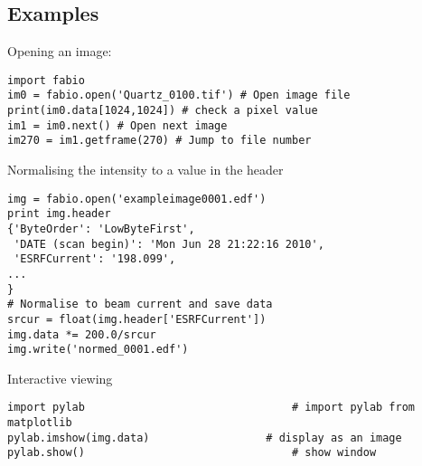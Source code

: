 \documentclass{iucr}
\begin{document}
\subsection{Examples}

Opening an image:

\begin{verbatim}
import fabio     
im0 = fabio.open('Quartz_0100.tif') # Open image file
print(im0.data[1024,1024]) # check a pixel value
im1 = im0.next() # Open next image
im270 = im1.getframe(270) # Jump to file number
\end{verbatim}

Normalising the intensity to a value in the header

\begin{verbatim}
img = fabio.open('exampleimage0001.edf')
print img.header
{'ByteOrder': 'LowByteFirst',
 'DATE (scan begin)': 'Mon Jun 28 21:22:16 2010',
 'ESRFCurrent': '198.099',
...
}
# Normalise to beam current and save data
srcur = float(img.header['ESRFCurrent'])
img.data *= 200.0/srcur
img.write('normed_0001.edf')
\end{verbatim}

Interactive viewing

\begin{verbatim}
import pylab								# import pylab from matplotlib
pylab.imshow(img.data)					# display as an image
pylab.show()								# show window
\end{verbatim}



\end{document}
